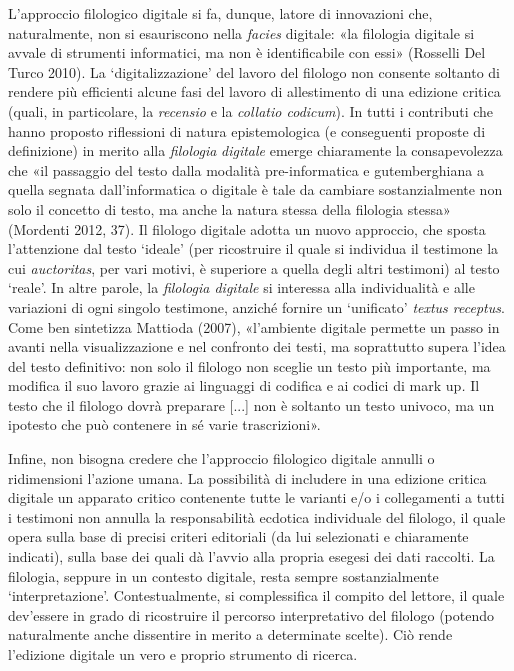 {{L'approccio filologico digitale si fa, dunque, latore di innovazioni
che, naturalmente, non si esauriscono nella \emph{facies} digitale: «la
filologia digitale si avvale di strumenti informatici, ma non è
identificabile con essi» (Rosselli Del Turco 2010). La
`digitalizzazione' del lavoro del filologo non consente soltanto di
rendere più efficienti alcune fasi del lavoro di allestimento di una
edizione critica (quali, in particolare, la \emph{recensio} e la
\emph{collatio codicum}). In tutti i contributi che hanno proposto
riflessioni di natura epistemologica (e conseguenti proposte di
definizione) in merito alla \emph{filologia} \emph{digitale} emerge
chiaramente la consapevolezza che «il passaggio del testo dalla modalità
pre-informatica e gutemberghiana a quella segnata dall'informatica o
digitale è tale da cambiare sostanzialmente non solo il concetto di
testo, ma anche la natura stessa della filologia stessa» (Mordenti 2012,
37). Il filologo digitale adotta un nuovo approccio, che sposta
l'attenzione dal testo `ideale' (per ricostruire il quale si individua
il testimone la cui \emph{auctoritas}, per vari motivi, è superiore a
quella degli altri testimoni) al testo `reale'. In altre parole, la
\emph{filologia digitale} si interessa alla individualità e alle
variazioni di ogni singolo testimone, anziché fornire un `unificato'
\emph{textus receptus}. Come ben sintetizza Mattioda (2007), «l'ambiente
digitale permette un passo in avanti nella visualizzazione e nel
confronto dei testi, ma soprattutto supera l'idea del testo definitivo:
non solo il filologo non sceglie un testo più importante, ma modifica il
suo lavoro grazie ai linguaggi di codifica e ai codici di mark
up\emph{.} Il testo che il filologo dovrà preparare {[}...{]} non è
soltanto un testo univoco, ma un ipotesto che può contenere in sé varie
trascrizioni».

Infine, non bisogna credere che l'approccio filologico digitale annulli
o ridimensioni l'azione umana. La possibilità di includere in una
edizione critica digitale un apparato critico contenente tutte le
varianti e/o i collegamenti a tutti i testimoni non annulla la
responsabilità ecdotica individuale del filologo, il quale opera sulla
base di precisi criteri editoriali (da lui selezionati e chiaramente
indicati), sulla base dei quali dà l'avvio alla propria esegesi dei dati
raccolti. La filologia, seppure in un contesto digitale, resta sempre
sostanzialmente `interpretazione'. Contestualmente, si complessifica il
compito del lettore, il quale dev'essere in grado di ricostruire il
percorso interpretativo del filologo (potendo naturalmente anche
dissentire in merito a determinate scelte). Ciò rende l'edizione
digitale un vero e proprio strumento di ricerca.

}}
